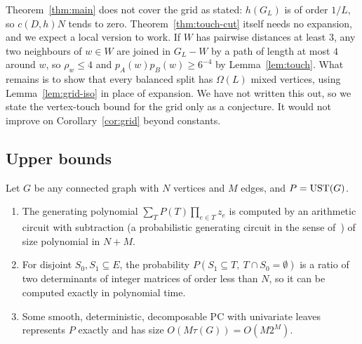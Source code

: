 Theorem~\ref{thm:main} does not cover the grid as stated: $h(G_L)$ is of order $1/L$, so $c(D,h)N$ tends to zero. Theorem~\ref{thm:touch-cut} itself needs no expansion, and we expect a local version to work. If $W$ has pairwise distances at least $3$, any two neighbours of $w\in W$ are joined in $G_L-W$ by a path of length at most $4$ around $w$, so $\rho_w\le4$ and $p_A(w)p_B(w)\ge6^{-4}$ by Lemma~\ref{lem:touch}. What remains is to show that every balanced split has $\Omega(L)$ mixed vertices, using Lemma~\ref{lem:grid-iso} in place of expansion. We have not written this out, so we state the vertex-touch bound for the grid only as a conjecture. It would not improve on Corollary~\ref{cor:grid} beyond constants.

\subsection{Upper bounds}

\begin{proposition}\label{prop:upper}
Let $G$ be any connected graph with $N$ vertices and $M$ edges, and $P=\mathrm{UST}(G)$.
\begin{enumerate}[label=(\alph*)]
\item The generating polynomial $\sum_TP(T)\prod_{e\in T}z_e$ is computed by an arithmetic circuit with subtraction (a probabilistic generating circuit in the sense of~\cite{ZhangJubaVdB21}) of size polynomial in $N+M$.
\item For disjoint $S_0,S_1\subseteq E$, the probability $P(S_1\subseteq T,\ T\cap S_0=\emptyset)$ is a ratio of two determinants of integer matrices of order less than $N$, so it can be computed exactly in polynomial time.
\item Some smooth, deterministic, decomposable PC with univariate leaves represents $P$ exactly and has size $O(M\tau(G))=O(M2^M)$.
\end{enumerate}
\end{proposition}

